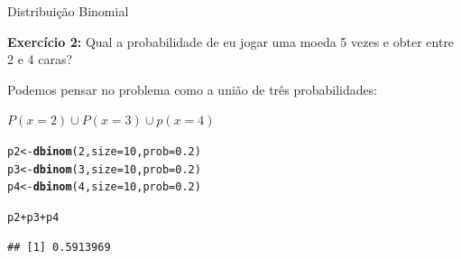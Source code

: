 \documentclass{beamer}\usepackage[]{graphicx}\usepackage[]{color}
\makeatletter
\newcommand{\hlnum}[1]{\textcolor[rgb]{0.686,0.059,0.569}{#1}}%
\newcommand{\hlopt}[1]{\textcolor[rgb]{0,0,0}{#1}}%
\newcommand{\hlstd}[1]{\textcolor[rgb]{0.345,0.345,0.345}{#1}}%
\newcommand{\hlkwb}[1]{\textcolor[rgb]{0.69,0.353,0.396}{#1}}%
\newcommand{\hlkwc}[1]{\textcolor[rgb]{0.333,0.667,0.333}{#1}}%
\newcommand{\hlkwd}[1]{\textcolor[rgb]{0.737,0.353,0.396}{\textbf{#1}}}%
\newenvironment{kframe}{%
 \def\at@end@of@kframe{}%
 \ifinner\ifhmode%
  \def\at@end@of@kframe{\end{minipage}}%
  \begin{minipage}{\columnwidth}%
 \fi\fi%
 \def\FrameCommand##1{\hskip\@totalleftmargin \hskip-\fboxsep
 \colorbox{shadecolor}{##1}\hskip-\fboxsep
     \hskip-\linewidth \hskip-\@totalleftmargin \hskip\columnwidth}%
 \MakeFramed {\advance\hsize-\width
   \@totalleftmargin\z@ \linewidth\hsize
   \@setminipage}}%
 {\par\unskip\endMakeFramed%
 \at@end@of@kframe}
\newenvironment{knitrout}{}{} %
\renewenvironment{knitrout}{\setlength{\topsep}{0mm}}{}
\makeatother
\begin{document}
\begin{frame}[fragile]{Distribuição Binomial}

\alert{\textbf{Exercício 2:}} Qual a probabilidade de eu jogar uma moeda 5 vezes e obter entre 2 e 4 caras?
\vfill

Podemos pensar no problema como a união de três probabilidades:

$P(x = 2) \cup P(x = 3) \cup p(x=4)$ \pause

\vfill

\begin{knitrout}\tiny
{}\color{fgcolor}\begin{kframe}
\begin{alltt}
\hlstd{p2} \hlkwb{<-} \hlkwd{dbinom}\hlstd{(}\hlnum{2}\hlstd{,}\hlkwc{size}\hlstd{=}\hlnum{10}\hlstd{,} \hlkwc{prob}\hlstd{=}\hlnum{0.2}\hlstd{)}
\hlstd{p3} \hlkwb{<-} \hlkwd{dbinom}\hlstd{(}\hlnum{3}\hlstd{,}\hlkwc{size}\hlstd{=}\hlnum{10}\hlstd{,} \hlkwc{prob}\hlstd{=}\hlnum{0.2}\hlstd{)}
\hlstd{p4} \hlkwb{<-} \hlkwd{dbinom}\hlstd{(}\hlnum{4}\hlstd{,}\hlkwc{size}\hlstd{=}\hlnum{10}\hlstd{,} \hlkwc{prob}\hlstd{=}\hlnum{0.2}\hlstd{)}

\hlstd{p2} \hlopt{+} \hlstd{p3} \hlopt{+} \hlstd{p4}
\end{alltt}
\begin{verbatim}
## [1] 0.5913969
\end{verbatim}
\end{kframe}
\end{knitrout}

\end{frame} 
\end{document}
